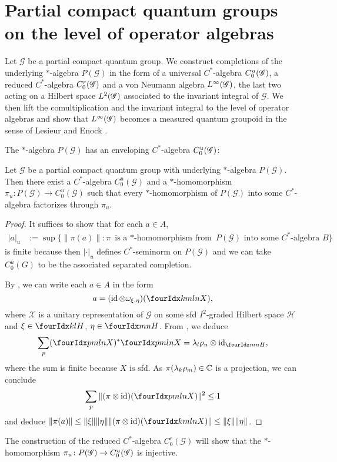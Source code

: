 \section{Partial compact quantum groups on the level of operator algebras}


Let $\mathscr{G}$ be a partial compact quantum group. We construct
completions of the underlying $*$-algebra $P(\mathscr{G})$ in the form
of a universal $C^{*}$-algebra $C^{u}_{0}(\mathscr{G})$, a reduced $C^{*}$-algebra
$C^{r}_{0}(\mathscr{G})$ and a von Neumann algebra $L^{\infty}(\mathscr{G})$, the last two acting on a
Hilbert space $L^{2}(\mathscr{G})$ associated to the invariant integral of
$\mathscr{G}$.  We then lift the comultiplication and the invariant
integral to the level of
operator algebras and show that $L^{\infty}(\mathscr{G})$ becomes a measured quantum
groupoid in the sense of Lesieur \cite{Les1} and Enock \cite{Eno2}.

The $*$-algebra $P(\mathscr{G})$ has an enveloping $C^{*}$-algebra $C^{u}_{0}(\mathscr{G})$:
\begin{Prop}
Let $\mathscr{G}$ be a partial compact quantum group with underlying
$*$-algebra $P(\mathscr{G})$. Then
  there exist a $C^{*}$-algebra $C^{u}_{0}(\mathscr{G})$ and a
  $*$-homomorphism $\pi_{u} \colon P(\mathscr{G}) \to
  C^{u}_{0}(\mathscr{G})$ such that every $*$-homomorphism of
  $P(\mathscr{G})$ into some $C^{*}$-algebra factorizes through
  $\pi_{u}$.
\end{Prop}
\begin{proof}
It suffices to show that for each $a \in A$,
\begin{align*} 
  |a|_{u}&:= \sup \{ \|\pi(a)\| : \pi \text{ is a $*$-homomorphism from } P(\mathscr{G})
  \text{ into some $C^{*}$-algebra } B\}
\end{align*}
is finite because then $|\cdot |_{u}$ defines $C^{*}$-seminorm on
$P(\mathscr{G})$ and we can take $C^{u}_{0}(G)$ to be the associated
separated completion.


By   \cite[Propositions 2.11 and 2.20]{DCT1}, we can write each $a\in A$
in the form \[a=(\id \otimes \omega_{\xi,\eta})(\Gr{X}{k}{l}{m}{n}),\]
where $\mathscr{X}$ is a unitary representation of
$\mathscr{G}$ on some sfd $I^{2}$-graded Hilbert space
$\mathcal{H}$ and $\xi\in \Gru{H}{k}{l}$, $\eta\in
\Gru{H}{m}{n}$.  From  \cite[Lemma 2.2]{DCT1}, we deduce
  \begin{align*}
    \sum_{p}(\Gr{X}{p}{l}{m}{n})^{*} \Gr{X}{p}{l}{m}{n}  = \lambda_{l}\rho_{n}
    \otimes \id_{\Gru{H}{m}{n}},
  \end{align*}
where  the sum is  finite because $X$ is sfd. As
  $\pi(\lambda_{k}\rho_{m})\in \mathbb{C}$ is a projection, we can conclude
  \begin{align} \label{eq:corep-estimate}
    \sum_{p} \| (\pi \otimes \id)(\Gr{X}{p}{l}{m}{n})\|^{2} \leq 1
  \end{align}
  and deduce $\|\pi(a)\| \leq \| \xi\| \|\eta\| \|(\pi \otimes \id)(\Gr{X}{k}{l}{m}{n})\| \leq
    \|\xi\|\|\eta\| $. 
\end{proof}
The construction of the reduced $C^{*}$-algebra
$C^{r}_{0}(\mathscr{G})$ will show that the $*$-homomorphism $\pi_{u}
\colon P(\mathscr{G}) \to C^{u}_{0}(\mathscr{G})$ is injective.

